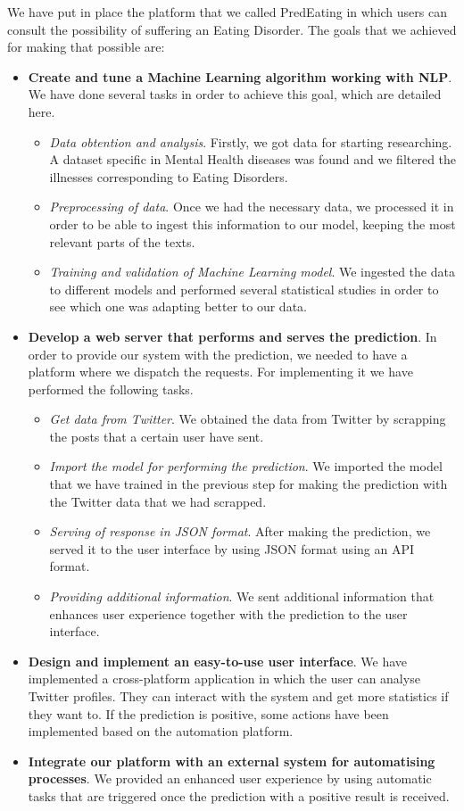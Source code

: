  We have put in place the platform that we called PredEating in which users can consult the possibility of suffering an Eating Disorder. The goals that we achieved for making that possible are:
\begin{itemize}
    \item \textbf{Create and tune a Machine Learning algorithm working with NLP}. We have done several tasks in order to achieve this goal, which are detailed here.
    \begin{itemize}
        \item \textit{Data obtention and analysis}. Firstly, we got data for starting researching. A dataset specific in Mental Health diseases was found and we filtered the illnesses corresponding to Eating Disorders.
        \item \textit{Preprocessing of data}. Once we had the necessary data, we processed it in order to be able to ingest this information to our model, keeping the most relevant parts of the texts.
        \item \textit{Training and validation of Machine Learning model}. We ingested the data to different models and performed several statistical studies in order to see which one was adapting better to our data.
    \end{itemize}
    \item \textbf{Develop a web server that performs and serves the prediction}. In order to provide our system with the prediction, we needed to have a platform where we dispatch the requests. For implementing it we have performed the following tasks.
    \begin{itemize}
        \item \textit{Get data from Twitter}. We obtained the data from Twitter by scrapping the posts that a certain user have sent.
        \item \textit{Import the model for performing the prediction}. We imported the model that we have trained in the previous step for making the prediction with the Twitter data that we had scrapped.
        \item \textit{Serving of response in JSON format}. After making the prediction, we served it to the user interface by using JSON format using an API format.
        \item \textit{Providing additional information}. We sent additional information that enhances user experience together with the prediction to the user interface.
    \end{itemize}
    \item \textbf{Design and implement an easy-to-use user interface}. We have implemented a cross-platform application in which the user can analyse Twitter profiles. They can interact with the system and get more statistics if they want to. If the prediction is positive, some actions have been implemented based on the automation platform.
    \item \textbf{Integrate our platform with an external system for automatising processes}. We provided an enhanced user experience by using automatic tasks that are triggered once the prediction with a positive result is received.
\end{itemize}

